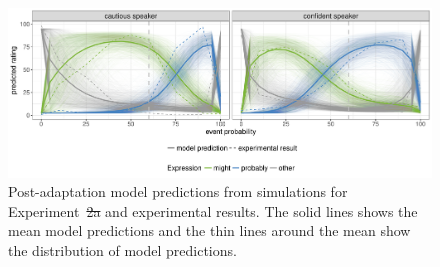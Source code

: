 \documentclass[man, floatsintext]{apa6}
\providecommand{\DIFadd}[1]{{\protect\color{blue}\uwave{#1}}} %
\providecommand{\DIFdel}[1]{{\protect\color{red}\sout{#1}}}                      %
\providecommand{\DIFaddFL}[1]{\DIFadd{#1}} %
\providecommand{\DIFdelFL}[1]{\DIFdel{#1}} %
\providecommand{\DIFaddbeginFL}{} %
\providecommand{\DIFaddendFL}{} %
\providecommand{\DIFdelbeginFL}{} %
\providecommand{\DIFdelendFL}{} %
\newcommand{\DIFscaledelfig}{0.5}
\newlength{\DIFdelgraphicswidth} %
\newlength{\DIFdelgraphicsheight} %
\newcommand{\DIFaddincludegraphics}[2][]{{\color{blue}\fbox{\DIFOincludegraphics[#1]{#2}}}} %
\newcommand{\DIFdelincludegraphics}[2][]{%
\sbox{\DIFdelgraphicsbox}{\DIFOincludegraphics[#1]{#2}}%
\settoboxwidth{\DIFdelgraphicswidth}{\DIFdelgraphicsbox} %
\settoboxtotalheight{\DIFdelgraphicsheight}{\DIFdelgraphicsbox} %
\scalebox{\DIFscaledelfig}{%
\parbox[b]{\DIFdelgraphicswidth}{\usebox{\DIFdelgraphicsbox}\\[-\baselineskip] \rule{\DIFdelgraphicswidth}{0em}}\llap{\resizebox{\DIFdelgraphicswidth}{\DIFdelgraphicsheight}{%
\setlength{\unitlength}{\DIFdelgraphicswidth}%
\begin{picture}(1,1)%
\thicklines\linethickness{2pt} %
{\color[rgb]{1,0,0}\put(0,0){\framebox(1,1){}}}%
{\color[rgb]{1,0,0}\put(0,0){\line( 1,1){1}}}%
{\color[rgb]{1,0,0}\put(0,1){\line(1,-1){1}}}%
\end{picture}%
}\hspace*{3pt}}} %
} %
\DeclareRobustCommand{\DIFaddbeginFL}{\DIFOaddbeginFL \let\includegraphics\DIFaddincludegraphics} %
\DeclareRobustCommand{\DIFaddendFL}{\DIFOaddendFL \let\includegraphics\DIFOincludegraphics} %
\DeclareRobustCommand{\DIFdelbeginFL}{\DIFOdelbeginFL \let\includegraphics\DIFdelincludegraphics} %
\DeclareRobustCommand{\DIFdelendFL}{\DIFOaddendFL \let\includegraphics\DIFOincludegraphics} %
\begin{document}
\begin{figure}
  \DIFdelbeginFL %
\DIFdelendFL \DIFaddbeginFL \includegraphics[width=\textwidth]{plots/adaptation-posterior-predictions-replication.pdf}
  \DIFaddendFL \caption{Post-adaptation model predictions from simulations for Experiment~\DIFdelbeginFL \DIFdelFL{2a }\DIFdelendFL \DIFaddbeginFL \DIFaddFL{2 }\DIFaddendFL and experimental results. 
  The solid lines shows the mean model predictions and the thin lines around the mean show the distribution of model predictions. \label{fig:post-exposure-model}}
\end{figure}
\end{document}
